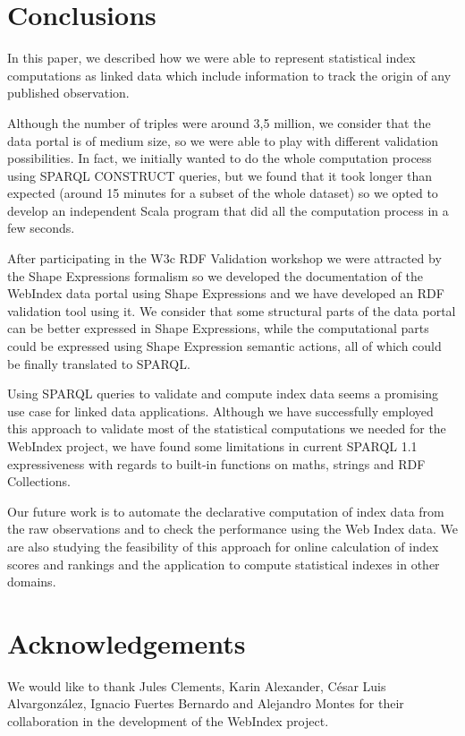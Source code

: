 \documentclass{llncs}
\newcommand{\TODO}[1]{{\color{red}{\textbf{TODO: {#1}}\xspace}}}
\begin{document}
\section{Conclusions}

In this paper, we described how we were able to represent statistical index computations as linked data which include information to track the origin of any published observation.

Although the number of triples were around 3,5 million, we consider that the data portal is of medium size, so we were able to play with different validation possibilities.
In fact, we initially wanted to do the whole computation process using SPARQL CONSTRUCT queries, but we found that it took longer than expected (around 15 minutes for a subset of the whole dataset) so we opted to develop an independent Scala program that did all the computation process in a few seconds.

After participating in the W3c RDF Validation workshop we were attracted by the Shape Expressions formalism so we developed the documentation of the WebIndex data portal using Shape Expressions and we have developed an RDF validation tool using it. We consider that some structural parts of the data portal can be better expressed in Shape Expressions, while the computational parts could be expressed using Shape Expression semantic actions, all of which could be finally translated to SPARQL.

Using SPARQL queries to validate and compute index data seems a promising use
case for linked data applications. 
Although we have successfully employed this approach to validate most of the
statistical computations we needed for the WebIndex project, we have found some
limitations in current SPARQL 1.1 expressiveness with regards to built-in
functions on maths, strings and RDF Collections.

Our future work is to automate the declarative computation of index data
 from the raw observations and to check the performance using
 the Web Index data. 
We are also studying the feasibility of this approach 
 for online calculation of index scores and rankings
 and the application to compute statistical indexes in
 other domains. 

\section{Acknowledgements}

We would like to thank Jules Clements, Karin Alexander, César Luis Alvargonzález, Ignacio Fuertes Bernardo and Alejandro Montes for their collaboration in the development of the WebIndex project.



\end{document}

